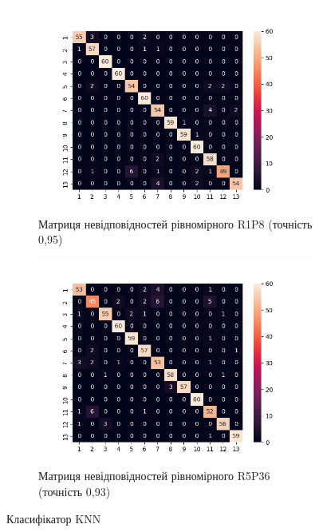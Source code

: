 \begin{figure}[h]
    \begin{subfigure}{0.5\textwidth}
    \includegraphics[width=0.95\linewidth]{img/confusion/knn-hist_R1_P8_u.png}
    \caption{
        Матриця невідповідностей рівномірного R1P8 (точність 0,95)
    }
    \end{subfigure}%
    \begin{subfigure}{0.5\textwidth}
    \includegraphics[width=0.95\linewidth]{img/confusion/knn-hist_R5_P36_u.png}
    \caption{
        Матриця невідповідностей рівномірного R5P36 (точність 0,93) 
    }
    \end{subfigure}%
    
    \caption{Класифікатор KNN}
    \label{fig:precision-2}
\end{figure}

